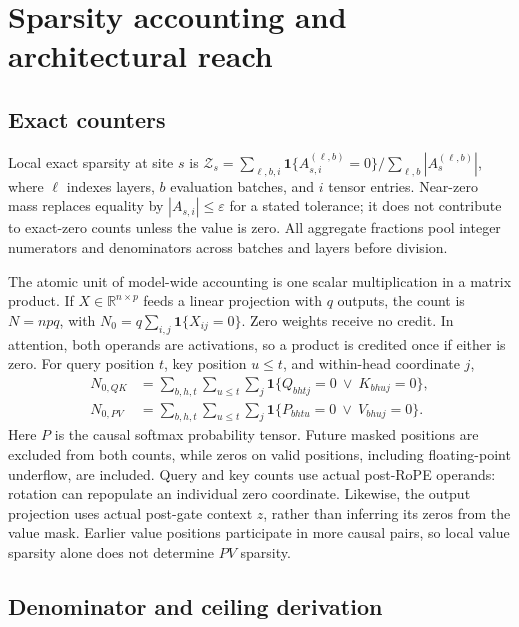 \section{Sparsity accounting and architectural reach}
\label{app:accounting}

\subsection{Exact counters}

Local exact sparsity at site $s$ is
$\mathcal{Z}_s=\sum_{\ell,b,i}\mathbf{1}\{A^{(\ell,b)}_{s,i}=0\}/
\sum_{\ell,b}|A_s^{(\ell,b)}|$, where $\ell$ indexes layers, $b$ evaluation
batches, and $i$ tensor entries. Near-zero mass replaces equality by
$|A_{s,i}|\leq\varepsilon$ for a stated tolerance; it does not contribute to
exact-zero counts unless the value is zero. All aggregate fractions pool
integer numerators and denominators across batches and layers before division.

The atomic unit of model-wide accounting is one scalar multiplication in a
matrix product. If $X\in\mathbb{R}^{n\times p}$ feeds a linear projection with
$q$ outputs, the count is $N=npq$, with $N_0=q\sum_{i,j}\mathbf{1}\{X_{ij}=0\}$.
Zero weights receive no credit. In attention, both operands are activations,
so a product is credited once if either is zero. For query position $t$,
key position $u\leq t$, and within-head coordinate $j$,
\begin{align}
N_{0,QK}&=\sum_{b,h,t}\sum_{u\leq t}\sum_j
\mathbf{1}\{Q_{bhtj}=0\ \lor\ K_{bhuj}=0\},\label{eq:qk-count}\\
N_{0,PV}&=\sum_{b,h,t}\sum_{u\leq t}\sum_j
\mathbf{1}\{P_{bhtu}=0\ \lor\ V_{bhuj}=0\}.\label{eq:pv-count}
\end{align}
Here $P$ is the causal softmax probability tensor. Future masked positions
are excluded from both counts, while zeros on valid positions, including
floating-point underflow, are included. Query and key counts use actual
post-RoPE operands: rotation can repopulate an individual zero coordinate.
Likewise, the output projection uses actual post-gate context $z$, rather than
inferring its zeros from the value mask. Earlier value positions participate
in more causal pairs, so local value sparsity alone does not determine $PV$
sparsity.

\subsection{Denominator and ceiling derivation}
\label{app:ceiling}

